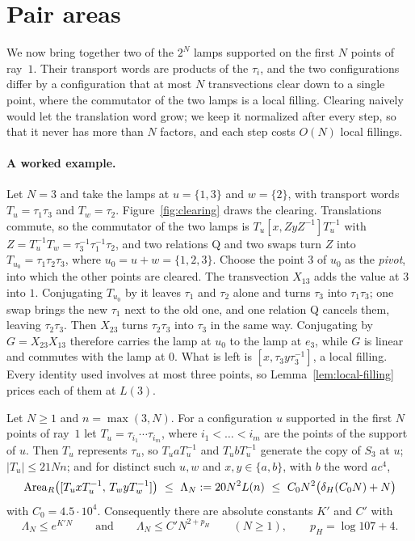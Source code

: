 \section{Pair areas}\label{sec:pair-areas}

We now bring together two of the $2^N$ lamps supported on the first $N$ points of ray~$1$. Their transport words are products of the $\tau_i$,
and the two configurations differ by a configuration that at most $N$ transvections clear down to a single point, where the commutator of the
two lamps is a local filling. Clearing naively would let the translation word grow; we keep it normalized after every step, so that it never
has more than $N$ factors, and each step costs $O(N)$ local fillings.

\paragraph{A worked example.} Let $N=3$ and take the lamps at $u=\{1,3\}$ and $w=\{2\}$, with transport words $T_u=\tau_1\tau_3$ and
$T_w=\tau_2$. Figure~\ref{fig:clearing} draws the clearing. Translations commute, so the commutator of the two lamps is $T_u[x,ZyZ^{-1}]T_u^{-1}$
with $Z=T_u^{-1}T_w=\tau_3^{-1}\tau_1^{-1}\tau_2$, and two relations \textsf{Q} and two swaps turn $Z$ into $T_{u_0}=\tau_1\tau_2\tau_3$, where
$u_0=u+w=\{1,2,3\}$. Choose the point $3$ of $u_0$ as the \emph{pivot}, into which the other points are cleared. The transvection $X_{13}$ adds
the value at $3$ into $1$. Conjugating $T_{u_0}$ by it leaves $\tau_1$ and $\tau_2$ alone and turns $\tau_3$ into $\tau_1\tau_3$; one swap brings
the new $\tau_1$ next to the old one, and one relation \textsf{Q} cancels them, leaving $\tau_2\tau_3$. Then $X_{23}$ turns $\tau_2\tau_3$ into
$\tau_3$ in the same way. Conjugating by $G=X_{23}X_{13}$ therefore carries the lamp at $u_0$ to the lamp at $e_3$, while $G$ is linear and
commutes with the lamp at $0$. What is left is $[x,\tau_3y\tau_3^{-1}]$, a local filling. Every identity used involves at most three points, so
Lemma~\ref{lem:local-filling} prices each of them at $L(3)$.



\begin{theorem}\label{thm:pair-area}
Let $N\ge1$ and $n=\max(3,N)$. For a configuration $u$ supported in the first $N$ points of ray~$1$ let $T_u=\tau_{i_1}\cdots\tau_{i_m}$,
where $i_1<\dots<i_m$ are the points of the support of $u$. Then $T_u$ represents $\tau_u$, so $T_uaT_u^{-1}$ and $T_ubT_u^{-1}$ generate the copy
of $S_3$ at $u$; $|T_u|\le21Nn$; and for distinct such $u,w$ and $x,y\in\{a,b\}$, with $b$ the word $ac^4$,
\[
\Area_R\bigl([T_uxT_u^{-1},\,T_wyT_w^{-1}]\bigr)\ \le\ \Lambda_N:=20N^2L(n)\ \le\ C_0N^2\bigl(\delta_H(C_0N)+N\bigr)
\]
with $C_0=4.5\cdot10^4$. Consequently there are absolute constants $K'$ and $C'$ with
\[
\Lambda_N\le e^{K'N}\qquad\text{and}\qquad \Lambda_N\le C'N^{2+p_H}\qquad(N\ge1),\qquad p_H=\log107+4 .
\]
\end{theorem}

